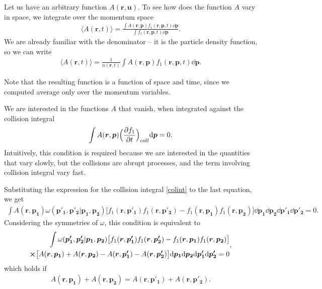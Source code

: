 Let us have an arbitrary function $A(\bm{r},\bm{u})$.
To see how does the function $A$ vary in space, we integrate over the momentum space
\begin{align} \label{averg}
\langle A(\bm{r},t) \rangle = \frac{\int A(\bm{r},\bm{p}) f_1(\bm{r},\bm{p},t) \dd \bm{p}}{\int f_1(\bm{r},\bm{p},t) \dd \bm{p}}.
\end{align}
We are already familiar with the denominator -- it is the particle density function, so we can write
\begin{align*}
\langle A(\bm{r},t) \rangle = \frac{1}{n(\bm{r},t)} \int A(\bm{r},\bm{p}) f_1(\bm{r},\bm{p},t) \dd \bm{p}.
\end{align*} 

Note that the resulting function is a function of space and time, since we computed average only over the momentum variables.

We are interested in the functions $A$ that vanish, when integrated against the collision integral
\begin{align*}
\int A(\bm{r},\bm{p})  \Big( \frac{\partial f_1}{\partial t} \Big)_{coll} \mathrm{d} \bm{p} = 0.
\end{align*}
Intuitively, this condition is required because we are interested in the quantities that vary slowly, but the collisions are abrupt processes, and the term involving collision integral vary fast.

Substituting the expression for the collision integral \ref{colint} to the last equation, we get
\begin{align*}
\int A(\bm{r},\bm{p_1}) \omega(\bm{p'_1},\bm{p'_2} | \bm{p_1}, \bm{p_2}) \big[f_1(\bm{r},\bm{p'_1})f_1(\bm{r},\bm{p'_2}) - f_1(\bm{r},\bm{p_1})f_1(\bm{r},\bm{p_2}) \big] \dd \bm{p_1} \dd \bm{p_2} \dd \bm{p'_1} \dd \bm{p'_2} = 0.
\end{align*}
Considering the symmetries of $\omega$, this condition is equivalent to
\begin{align*}
\begin{split}
\int \omega(\bm{p'_1},\bm{p'_2} | \bm{p_1}, \bm{p_2}) \big[f_1(\bm{r},\bm{p'_1})f_1(\bm{r},\bm{p'_2}) - f_1(\bm{r},\bm{p_1})f_1(\bm{r},\bm{p_2}) \big] \\ \cross \big[A(\bm{r},\bm{p_1}) + A(\bm{r},\bm{p_2}) - A(\bm{r},\bm{p'_1}) - A(\bm{r},\bm{p'_2}) \big] \mathrm{d} \bm{p_1} \mathrm{d} \bm{p_2} \mathrm{d} \bm{p'_1} \mathrm{d} \bm{p'_2} = 0
\end{split},
\end{align*}
which holds if
\begin{align*}
A(\bm{r},\bm{p_1}) + A(\bm{r},\bm{p_2}) = A(\bm{r},\bm{p'_1}) + A(\bm{r},\bm{p'_2}).
\end{align*}

